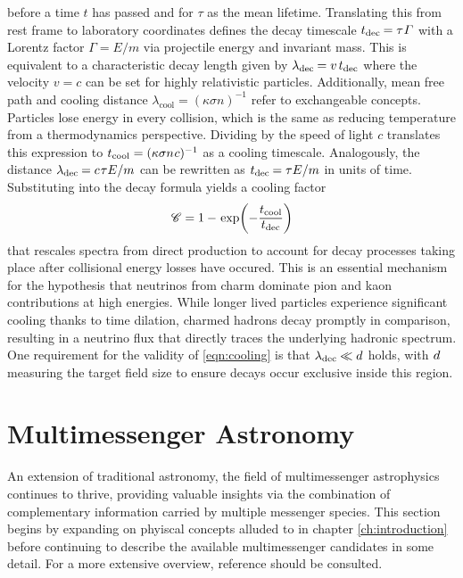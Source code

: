 before a time $t$ has passed and for $\tau$ as the mean lifetime. Translating this from rest frame to laboratory coordinates defines
the decay timescale $t_\text{dec} \kern-0.6pt = \tau \kern+0.4pt \varGamma$ with a Lorentz factor $\varGamma = E / m$ via
projectile energy and invariant mass. This is equivalent to a characteristic decay length given by
$\lambda_\text{dec} \kern-0.5pt = v \kern+1.5pt t_\text{dec}$ where the velocity $v = c$ can be set for highly relativistic particles.
Additionally, mean free path and cooling distance $\lambda_\text{cool} = (\kappa\sigma n)^{-1}$ refer to exchangeable concepts. Particles
lose energy in every collision, which is the same as reducing temperature from a thermodynamics perspective. Dividing by the speed of
light $c$ translates this expression to $t_\text{cool} = (\kappa\sigma n \kern+0.5pt c)^{-1}$ as a cooling timescale. Analogously, the
distance $\lambda_\text{dec} \kern-0.5pt = c \kern+0.8pt \tau E / m$ can be rewritten as
$t_\text{dec} \kern-0.6pt = \tau E / m$ in units of time. Substituting into the decay formula yields a cooling factor
\begin{equation}
	\mathscr{C} = 1 - \kern+0.9pt \exp \biggl( -\frac{t_\text{cool}}{\raisebox{0.5ex}{$t_\text{dec}$}} \biggr)
	\label{eqn:cooling}
\end{equation}
that rescales spectra from direct production to account for decay processes taking place after collisional energy losses have occured.
This is an essential mechanism for the hypothesis that neutrinos from charm dominate pion and kaon contributions at high energies.
While longer lived particles experience significant cooling thanks to time dilation, charmed hadrons decay promptly in comparison, resulting
in a neutrino flux that directly traces the underlying hadronic spectrum. One requirement for the validity of \eqref{eqn:cooling} is that
$\lambda_\text{dec} \kern-0.3pt \ll d \kern+0.5pt$ holds, with $d \kern+0.5pt$ measuring the target field size to ensure decays occur exclusive
inside this region. 


\newpage


\section{Multimessenger Astronomy}
\label{sec:multimessenger}

An extension of traditional astronomy, the field of multimessenger astrophysics continues to thrive, providing valuable insights via the
combination of complementary information carried by multiple messenger species. This section begins by expanding on phyiscal concepts
alluded to in chapter \ref{ch:introduction} before continuing to describe the available multimessenger candidates in some detail. For
a more extensive overview, reference \cite{Meszaros_2019} should be consulted.




